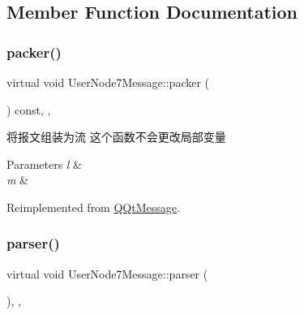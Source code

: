 \subsection{Member Function Documentation}
\mbox{\label{class_user_node7_message_a4657923a057070effd2f19278cfb191f}} 
\subsubsection{\texorpdfstring{packer()}{packer()}}
{\footnotesize\ttfamily virtual void User\+Node7\+Message\+::packer (\begin{DoxyParamCaption}\item[{Q\+Byte\+Array \&}]{ }\end{DoxyParamCaption}) const\hspace{0.3cm}{\ttfamily [inline]}, {\ttfamily [override]}, {\ttfamily [virtual]}}



将报文组装为流 这个函数不会更改局部变量 


\begin{DoxyParams}{Parameters}
{\em l} & \\
\hline
{\em m} & \\
\hline
\end{DoxyParams}


Reimplemented from \mbox{\hyperlink{class_q_qt_message_af1885c2c3628495808dca66ee8d72e14}{Q\+Qt\+Message}}.

\mbox{\label{class_user_node7_message_aac02ca8afa94556daf0513c01f71caa6}} 
\subsubsection{\texorpdfstring{parser()}{parser()}}
{\footnotesize\ttfamily virtual void User\+Node7\+Message\+::parser (\begin{DoxyParamCaption}\item[{const Q\+Byte\+Array \&}]{ }\end{DoxyParamCaption})\hspace{0.3cm}{\ttfamily [inline]}, {\ttfamily [override]}, {\ttfamily [virtual]}}



